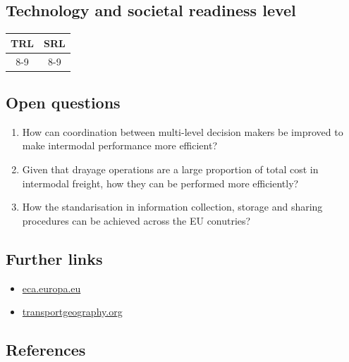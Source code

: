 \documentclass[
]{book}
\providecommand{\tightlist}{%
  \setlength{\itemsep}{0pt}\setlength{\parskip}{0pt}}
\begin{document}
\hypertarget{technology-and-societal-readiness-level-29}{%
\subsection*{Technology and societal readiness level}\label{technology-and-societal-readiness-level-29}}

\begin{longtable}[]{@{}cc@{}}
\toprule
TRL & SRL\tabularnewline
\midrule
\endhead
8-9 & 8-9\tabularnewline
\bottomrule
\end{longtable}

\hypertarget{open-questions-29}{%
\subsection*{Open questions}\label{open-questions-29}}

\begin{enumerate}
\def\labelenumi{\arabic{enumi}.}
\tightlist
\item
  How can coordination between multi-level decision makers be improved to make intermodal performance more efficient?
\item
  Given that drayage operations are a large proportion of total cost in intermodal freight, how they can be performed more efficiently?
\item
  How the standarisation in information collection, storage and sharing procedures can be achieved across the EU conutries?
\end{enumerate}

\hypertarget{further-links-26}{%
\subsection*{Further links}\label{further-links-26}}

\begin{itemize}
\tightlist
\item
  \href{https://www.eca.europa.eu/en/Pages/DocItem.aspx?did=36398}{eca.europa.eu}
\item
  \href{https://transportgeography.org/contents/chapter5/intermodal-transportation-containerization/}{transportgeography.org}
\end{itemize}

\hypertarget{references-29}{%
\subsection*{References}\label{references-29}}
\end{document}
